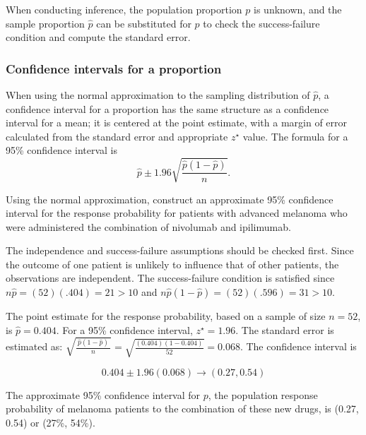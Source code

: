 When conducting inference, the population proportion $p$ is unknown, and the sample proportion $\hat{p}$ can be substituted for $p$ to check the success-failure condition and compute the standard error.

\subsubsection{Confidence intervals for a proportion}
\label{confIntForPropSection}


When using the normal approximation to the sampling distribution of $\hat{p}$, a confidence interval for a proportion has the same structure as a confidence interval for a mean; it is centered at the point estimate, with a margin of error calculated from the standard error and appropriate $z^{\star}$ value.  The formula for a 95\% confidence interval is
\[
  \hat{p} \pm 1.96 \sqrt{\frac{\hat{p}(1-\hat{p})}{n}}.
\]


\begin{example}{Using the normal approximation, construct an approximate 95\% confidence interval for the response probability for patients with advanced melanoma who were administered the combination of nivolumab and ipilimumab.}

The independence and success-failure assumptions should be checked first.  Since the outcome of one patient is unlikely to influence that of other patients, the observations are independent.  The success-failure condition is satisfied since $n\hat{p} = (52)(.404) = 21  > 10$ and $n\hat{p}(1 - \hat{p}) = (52)(.596) = 31  > 10$.

The point estimate for the response probability, based on a sample of size $n = 52$, is $\hat{p} = 0.404$. For a 95\% confidence interval, $z^{\star} = 1.96$. The standard error is estimated as: $\sqrt{\frac{\ \hat{p}(1-\hat{p})\ }{n}} = \sqrt{\frac{(0.404)(1-0.404)}{52}} = 0.068$.  The confidence interval is

\[0.404 \pm 1.96 (0.068) \rightarrow (0.27, 0.54) \]

The approximate 95\% confidence interval for $p$, the population response probability of melanoma patients to the combination of these new drugs, is (0.27, 0.54) or (27\%, 54\%).  

\end{example}

